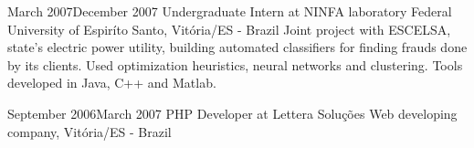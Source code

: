 \documentclass{friggeri-cv}
\begin{document}

\workentry
  {March 2007}{December 2007}
  {Undergraduate Intern at NINFA laboratory}
  {Federal University of Espiríto Santo, Vitória/ES - Brazil}
  {Joint project with ESCELSA, state's electric power utility, building automated classifiers
  for finding frauds done by its clients. Used optimization heuristics, neural networks and clustering.
  Tools developed in Java, C++ and Matlab.}

\workentry
  {September 2006}{March 2007}
  {PHP Developer at Lettera Soluções}
  {Web developing company, Vitória/ES - Brazil}
  {}%

\end{document}
